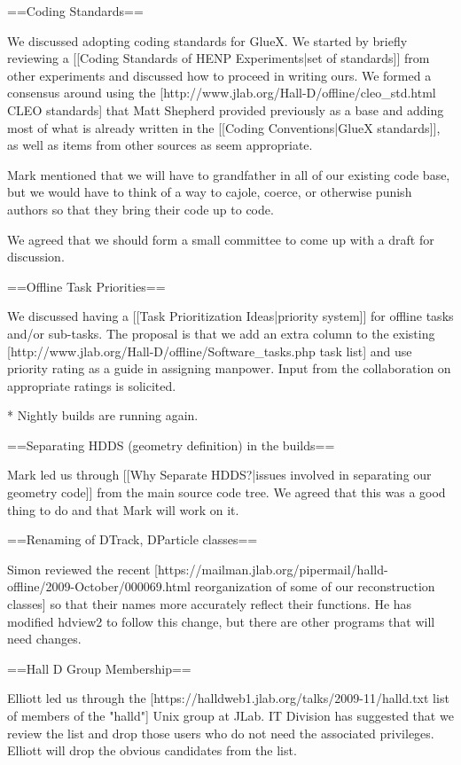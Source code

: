 \documentclass[xcolor=dvipsnames]{beamer}
\begin{document}
{==Coding Standards==

We discussed adopting coding standards for GlueX. We started by briefly reviewing a [[Coding Standards of HENP Experiments|set of standards]] from other experiments and discussed how to proceed in writing ours. We formed a consensus around using the [http://www.jlab.org/Hall-D/offline/cleo_std.html CLEO standards] that Matt Shepherd provided previously as a base and adding most of what is already written in the [[Coding Conventions|GlueX standards]], as well as items from other sources as seem appropriate.

Mark mentioned that we will have to grandfather in all of our existing code base, but we would have to think of a way to cajole, coerce, or otherwise punish authors so that they bring their code up to code.

We agreed that we should form a small committee to come up with a draft for discussion.

==Offline Task Priorities==

We discussed having a [[Task Prioritization Ideas|priority system]] for offline tasks and/or sub-tasks. The proposal is that we add an extra column to the existing [http://www.jlab.org/Hall-D/offline/Software_tasks.php task list] and use priority rating as a guide in assigning manpower. Input from the collaboration on appropriate ratings is solicited.

* Nightly builds are running again.

==Separating HDDS (geometry definition) in the builds==

Mark led us through [[Why Separate HDDS?|issues involved in separating our geometry code]] from the main source code tree. We agreed that this was a good thing to do and that Mark will work on it.

==Renaming of DTrack, DParticle classes==

Simon reviewed the recent [https://mailman.jlab.org/pipermail/halld-offline/2009-October/000069.html reorganization of some of our reconstruction classes] so that their names more accurately reflect their functions.
He has modified hdview2 to follow this change, but there are other programs that will need changes.

==Hall D Group Membership==

Elliott led us through the [https://halldweb1.jlab.org/talks/2009-11/halld.txt list of members of the "halld"] Unix group at JLab. IT Division has suggested that we review the list and drop those users who do not need the associated privileges. Elliott will drop the obvious candidates from the list.

}
\end{document}

